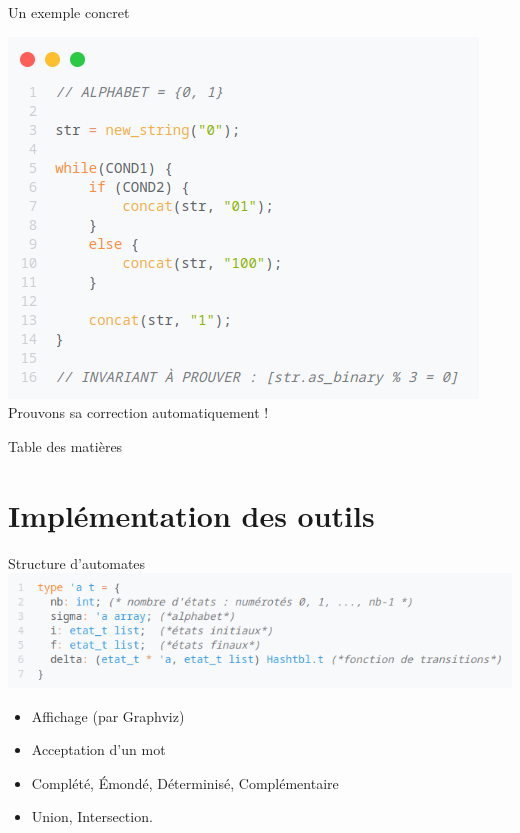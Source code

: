 \documentclass{beamer}
\begin{document}
\begin{frame}{Un exemple concret}
  \begin{center}
  \includegraphics[scale=0.7]{ prog0 }
  Prouvons sa correction automatiquement !
  \end{center}
\end{frame}

\begin{frame}{Table des matières}
  \tableofcontents
\end{frame}


\section{Implémentation des outils}

\begin{frame}{Structure d'automates}
  \includegraphics[scale=0.7]{ type_automate }
  \begin{itemize}
    \item Affichage (par Graphviz)
    \item Acceptation d'un mot
    \item Complété, Émondé, Déterminisé, Complémentaire
    \item Union, Intersection.
  \end{itemize}
\end{frame}
\end{document}
